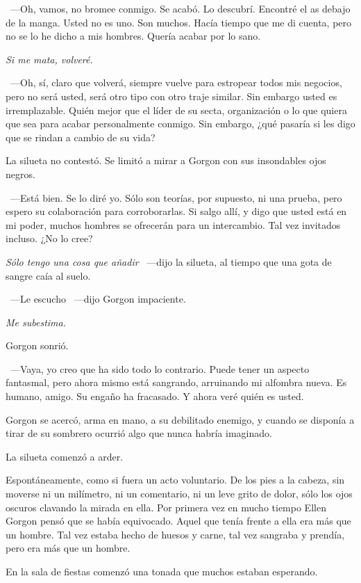~---Oh, vamos, no bromee conmigo. Se acabó. Lo descubrí. Encontré el as debajo de la manga. Usted no es uno. Son muchos. Hacía tiempo que me di cuenta, pero no se lo he dicho a mis hombres. Quería acabar por lo sano.

\emph{Si me mata, volveré.}

~---Oh, sí, claro que volverá, siempre vuelve para estropear todos mis negocios, pero no será usted, será otro tipo con otro traje similar. Sin embargo usted es irremplazable. Quién mejor que el líder de su secta, organización o lo que quiera que sea para acabar personalmente conmigo. Sin embargo, ¿qué pasaría si les digo que se rindan a cambio de su vida?

La silueta no contestó. Se limitó a mirar a Gorgon con sus insondables ojos negros.

~---Está bien. Se lo diré yo. Sólo son teorías, por supuesto, ni una prueba, pero espero su colaboración para corroborarlas. Si salgo allí, y digo que usted está en mi poder, muchos hombres se ofrecerán para un intercambio. Tal vez invitados incluso. ¿No lo cree?

\emph{Sólo tengo una cosa que añadir} ~---dijo la silueta, al tiempo que una gota de sangre caía al suelo.

~---Le escucho ~---dijo Gorgon impaciente.

\emph{Me subestima.}

Gorgon sonrió.

~---Vaya, yo creo que ha sido todo lo contrario. Puede tener un aspecto fantasmal, pero ahora mismo está sangrando, arruinando mi alfombra nueva. Es humano, amigo. Su engaño ha fracasado. Y ahora veré quién es usted.

Gorgon se acercó, arma en mano, a su debilitado enemigo, y cuando se disponía a tirar de su sombrero ocurrió algo que nunca habría imaginado.

La silueta comenzó a arder.

Espontáneamente, como si fuera un acto voluntario. De los pies a la cabeza, sin moverse ni un milímetro, ni un comentario, ni un leve grito de dolor, sólo los ojos oscuros clavando la mirada en ella. Por primera vez en mucho tiempo Ellen Gorgon pensó que se había equivocado. Aquel que tenía frente a ella era más que un hombre. Tal vez estaba hecho de huesos y carne, tal vez sangraba y prendía, pero era más que un hombre.

\parbreak
En la sala de fiestas comenzó una tonada que muchos estaban esperando.

